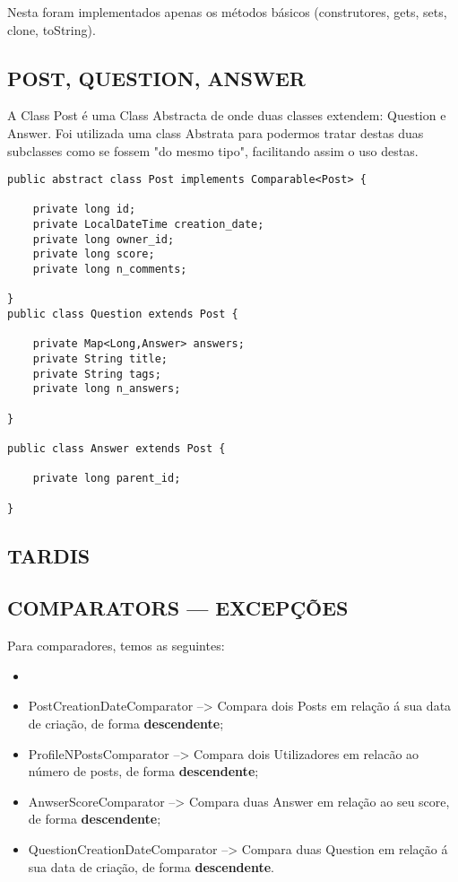 Nesta foram implementados apenas os métodos básicos (construtores, gets, sets, clone, toString).

\subsection{POST, QUESTION, ANSWER}

A Class Post é uma Class Abstracta de onde duas classes extendem: Question e Answer.
Foi utilizada uma class Abstrata para podermos tratar destas duas subclasses como se fossem "do mesmo tipo", facilitando assim o uso destas.

\begin{lstlisting}
public abstract class Post implements Comparable<Post> {

    private long id;
    private LocalDateTime creation_date;
    private long owner_id;
    private long score;
    private long n_comments;

}
public class Question extends Post {

    private Map<Long,Answer> answers;
    private String title;
    private String tags;
    private long n_answers;

}

public class Answer extends Post {

    private long parent_id;

}
\end{lstlisting}

\subsection{TARDIS}

\subsection{COMPARATORS --- EXCEPÇÕES}

Para comparadores, temos as seguintes:
\begin{itemize}
    \item \item PostCreationDateComparator --> Compara dois Posts em relação á sua data de criação, de forma \textbf{descendente};
    \item ProfileNPostsComparator --> Compara dois Utilizadores em relacão ao número de posts, de forma \textbf{descendente};
    \item AnwserScoreComparator --> Compara duas Answer em relação ao seu score, de forma \textbf{descendente};
    \item QuestionCreationDateComparator --> Compara duas Question em relação á sua data de criação, de forma \textbf{descendente}.
\end{itemize}


